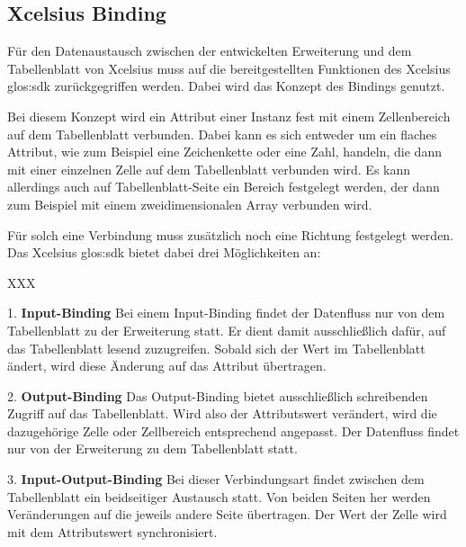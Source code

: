 \begin{onehalfspacing}
\subsection{Xcelsius Binding}
Für den Datenaustausch zwischen der entwickelten Erweiterung und dem Tabellenblatt von Xcelsius muss auf die bereitgestellten Funktionen des Xcelsius \gls{glos:sdk} zurückgegriffen werden. Dabei wird das Konzept des Bindings genutzt.

Bei diesem Konzept wird ein Attribut einer Instanz fest mit einem Zellenbereich auf dem Tabellenblatt verbunden. Dabei kann es sich entweder um ein flaches Attribut, wie zum Beispiel eine Zeichenkette oder eine Zahl, handeln, die dann mit einer einzelnen Zelle auf dem Tabellenblatt verbunden wird. Es kann allerdings auch auf Tabellenblatt-Seite ein Bereich festgelegt werden, der dann zum Beispiel mit einem zweidimensionalen Array verbunden wird.

Für solch eine Verbindung muss zusätzlich noch eine Richtung festgelegt werden. Das Xcelsius \gls{glos:sdk} bietet dabei drei Möglichkeiten an:

\begin{seToplist}{ XXX }

\item[1.] \textbf{Input-Binding} \newline
Bei einem Input-Binding findet der Datenfluss nur von dem Tabellenblatt zu der Erweiterung statt. Er dient damit ausschließlich dafür, auf das Tabellenblatt lesend zuzugreifen. Sobald sich der Wert im Tabellenblatt ändert, wird diese Änderung auf das Attribut übertragen.

\item[2.] \textbf{Output-Binding} \newline
Das Output-Binding bietet ausschließlich schreibenden Zugriff auf das Tabellenblatt. Wird also der Attributswert verändert, wird die dazugehörige Zelle oder Zellbereich entsprechend angepasst. Der Datenfluss findet nur von der Erweiterung zu dem Tabellenblatt statt.

\item[3.] \textbf{Input-Output-Binding} \newline
Bei dieser Verbindungsart findet zwischen dem Tabellenblatt ein beidseitiger Austausch statt. Von beiden Seiten her werden Veränderungen auf die jeweils andere Seite übertragen. Der Wert der Zelle wird mit dem Attributswert synchronisiert.

\end{seToplist}


\end{onehalfspacing}
